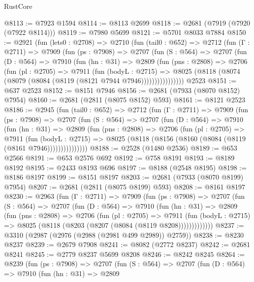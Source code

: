 \begin{lexlean}{RustCore}
\begin{coremodule}
@8113 := @7923 @1594
@8114 := @8113 @2699
@8118 := @2681 (@7919 (@7920 (@7922 @8114)))
@8119 := @7980 @5699
@8121 := @5701 @8033 @7884
@8150 := @2921
    (fun (lets0 : @2708) =>
    @2710
      (fun (tail0 : @652) =>
      @2712
        (fun (Γ : @2711) =>
        @7909
          (fun (ps : @7908) =>
          @2707
            (fun (S : @564) =>
            @2707
              (fun (D : @564) =>
              @7910
                (fun (hn : @31) =>
                @2809
                  (fun (pns : @2808) =>
                  @2706
                    (fun (pl : @2705) =>
                    @7911
                      (fun (bodyL : @2715) =>
                      @8025 (@8118 (@8074 (@8079 (@8084 (@8119 (@8121 @7944 @7946))))))))))))))))
    @2523
@8151 := @637 @2523
@8152 := @8151 @7946
@8156 := @2681 (@7933 (@8070 @8152) @7954)
@8160 := @2681 (@2811 (@8075 @8152) @593)
@8161 := @8121 @2523
@8186 := @2945
    (fun (tail0 : @652) =>
    @2712
      (fun (Γ : @2711) =>
      @7909
        (fun (ps : @7908) =>
        @2707
          (fun (S : @564) =>
          @2707
            (fun (D : @564) =>
            @7910
              (fun (hn : @31) =>
              @2809
                (fun (pns : @2808) =>
                @2706
                  (fun (pl : @2705) =>
                  @7911
                    (fun (bodyL : @2715) =>
                    @8025 (@8118 (@8156 (@8160 (@8084 (@8119 (@8161 @7946)))))))))))))))
@8188 := @2528 (@1480 @2536)
@8189 := @653 @2566
@8191 := @653 @2576 @692
@8192 := @758 @8191
@8193 := @8189 @8192
@8195 := @2433 @8193 @696
@8197 := @8188 (@2548 @8195)
@8198 := @8186 @8197
@8199 := @8151 @8197
@8203 := @2681 (@7933 (@8070 @8199) @7954)
@8207 := @2681 (@2811 (@8075 @8199) @593)
@8208 := @8161 @8197
@8230 := @2963
    (fun (Γ : @2711) =>
    @7909
      (fun (ps : @7908) =>
      @2707
        (fun (S : @564) =>
        @2707
          (fun (D : @564) =>
          @7910
            (fun (hn : @31) =>
            @2809
              (fun (pns : @2808) =>
              @2706
                (fun (pl : @2705) =>
                @7911
                  (fun (bodyL : @2715) =>
                  @8025 (@8118 (@8203 (@8207 (@8084 (@8119 @8208)))))))))))))
@8237 := @3310 (@2987 (@2976 (@2988 (@2981 @499 @2989)) @2759))
@8238 := @8230 @8237
@8239 := @2679 @7908
@8241 := @8082 (@2772 @8237)
@8242 := @2681 @8241
@8245 := @2779 @8237 @5699 @8208
@8246 := @8242 @8245
@8264 := @8239
    (fun (ps : @7908) =>
    @2707
      (fun (S : @564) =>
      @2707
        (fun (D : @564) =>
        @7910
          (fun (hn : @31) =>
          @2809

\end{coremodule}
\end{lexlean}
